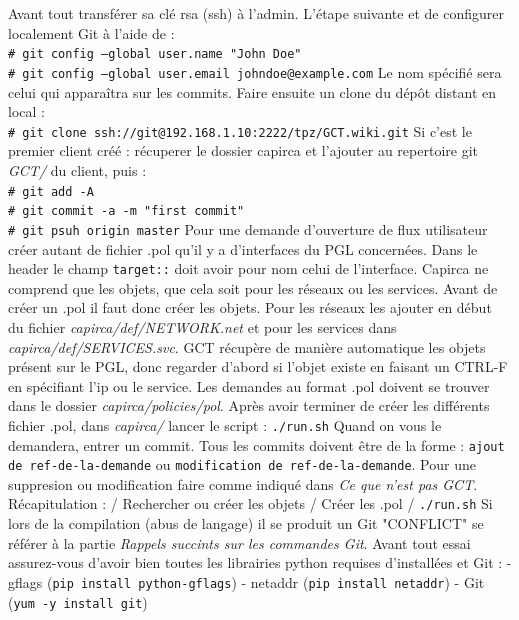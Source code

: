\documentclass{article}
\newcommand{\shellcmdd}[1]{\\\indent\indent\texttt{\footnotesize\# #1}}
\begin{document}
      \noindent Avant tout transférer sa clé rsa (ssh) à l'admin. L'étape suivante et de configurer localement Git à l'aide de : \shellcmdd{git config --global user.name "John Doe"}
      \shellcmdd{git config --global user.email johndoe@example.com}\smallbreak
      \noindent Le nom spécifié sera celui qui apparaîtra sur les commits.
      \noindent Faire ensuite un clone du dépôt distant en local : \shellcmdd{git clone ssh://git@192.168.1.10:2222/tpz/GCT.wiki.git} \smallbreak
      \noindent Si c'est le premier client créé : récuperer le dossier capirca et l'ajouter au repertoire git \textit{GCT/} du client, puis :
      \shellcmdd{git add -A}
      \shellcmdd{git commit -a -m "first commit"}\smallbreak
      \shellcmdd{git psuh origin master}\smallbreak
      \noindent Pour une demande d'ouverture de flux utilisateur créer autant de fichier .pol qu'il y a d'interfaces du PGL concernées.
      Dans le header le champ \texttt{target::} doit avoir pour nom celui de l'interface.
      Capirca ne comprend que les objets, que cela soit pour les réseaux ou les services.
      Avant de créer un .pol il faut donc créer les objets. Pour les réseaux les ajouter en début du fichier \textit{capirca/def/NETWORK.net}
      et pour les services dans \textit{capirca/def/SERVICES.svc}. GCT récupère de manière automatique les objets présent
      sur le PGL, donc regarder d'abord si l'objet existe en faisant un CTRL-F en spécifiant l'ip ou le service.
      Les demandes au format .pol doivent se trouver dans le dossier \textit{capirca/policies/pol}.
      Après avoir terminer de créer les différents fichier .pol, dans \textit{capirca/} lancer le script  : \texttt{./run.sh} \smallbreak
      \noindent Quand on vous le demandera, entrer un commit. Tous les commits doivent être de la forme : \texttt{ajout de ref-de-la-demande} ou
      \texttt{modification de ref-de-la-demande}. Pour une suppresion ou modification faire comme indiqué dans \textit{Ce que n'est pas GCT}.
      \bigbreak Récapitulation : / Rechercher ou créer les objets / Créer les .pol / \texttt{./run.sh} \bigbreak
      \noindent Si lors de la compilation (abus de langage) il se produit un Git "CONFLICT" se référer à la partie \textit{Rappels succints
      sur les commandes Git}.
      Avant tout essai assurez-vous d'avoir bien toutes les librairies python requises d'installées et Git : \smallbreak
      - gflags (\texttt{pip install python-gflags}) \smallbreak
      - netaddr (\texttt{pip install netaddr}) \smallbreak
      - Git (\texttt{yum -y install git})
\end{document}
